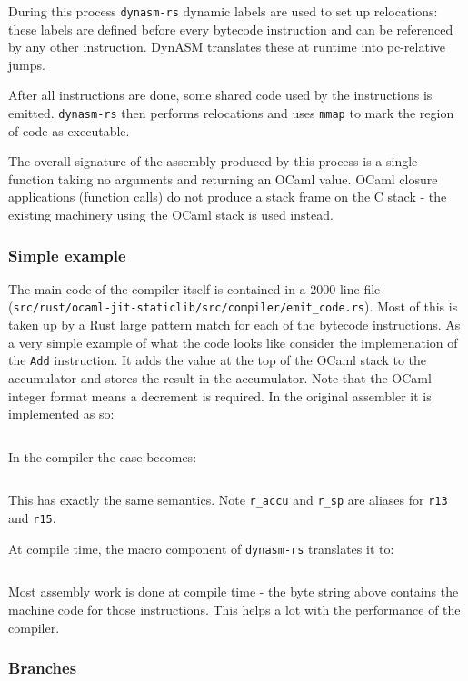 During this process \texttt{dynasm-rs} dynamic labels are used to set up relocations: these
labels are defined before every bytecode instruction and can be referenced by any other
instruction. DynASM translates these at runtime into pc-relative jumps.

After all instructions are done, some shared code used by the instructions is emitted.
\texttt{dynasm-rs} then performs relocations and uses \texttt{mmap} to mark the region of code as
executable.

The overall signature of the assembly produced by this process is a single function taking no
arguments and returning an OCaml value. OCaml closure applications (function calls) do not produce
a stack frame on the C stack - the existing machinery using the OCaml stack is used instead.

\subsubsection{Simple example}

The main code of the compiler itself is contained in a 2000 line file
(\texttt{src/rust/ocaml-jit-staticlib/src/compiler/emit\_code.rs}). Most of this is taken up by a
Rust large pattern match for each of the bytecode instructions. As a very simple example of what
the code looks like consider the implemenation of the \texttt{Add} instruction. It adds the value
at the top of the OCaml stack to the accumulator and stores the result in the accumulator. Note
that the OCaml integer format means a decrement is required. In the original assembler it is
implemented as so:

\inputminted{c}{snippets/add.c}

In the compiler the case becomes:

\inputminted{rust}{snippets/add.rs}

This has exactly the same semantics. Note \texttt{r\_accu} and \texttt{r\_sp}
are aliases for \texttt{r13} and \texttt{r15}.

At compile time, the macro component of \texttt{dynasm-rs} translates it to:

\inputminted{rust}{snippets/add_comp.rs}

Most assembly work is done at compile time - the byte string above contains the machine code for
those instructions. This helps a lot with the performance of the compiler.

\subsubsection{Branches}

